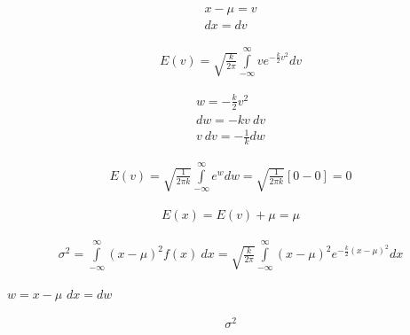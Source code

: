 \documentclass{article}
\begin{document}
\begin{align*}
  x-\mu = v\\
  dx=dv
\end{align*}

\begin{align}
  E(v)=\sqrt{\frac{k}{2\pi}}\int\limits_{-\infty}^{\infty}ve^{-\frac{k}{2}v^2}dv 
\end{align}

\begin{align*}
  w=-\frac{k}{2}v^2\\
  dw=-kv\ dv\\
  v\ dv = -\frac{1}{k}dw
\end{align*}

\begin{align}
  E(v)=\sqrt{\frac{1}{2\pi k}}\int\limits_{-\infty}^{\infty}e^{w}dw = \sqrt{\frac{1}{2\pi k}}[0-0] = 0
\end{align}


\begin{align*}
  E(x)=E(v)+\mu = \mu
\end{align*}

\begin{align}
  \sigma^{2}=\int\limits_{-\infty}^{\infty}\left( x-\mu \right)^2 f(x)\ dx = \sqrt{\frac{k}{2\pi}} \int\limits_{-\infty}^{\infty}\left( x-\mu \right)^2 e^{-\frac{k}{2}\left( x-\mu \right)^2}dx
\end{align}

\begin{multicols}{2}
  $w=x-\mu$
  \vfill\columnbreak
  $dx=dw$
\end{multicols}

\begin{align}
  \sigma^2
\end{align}
\end{document}
